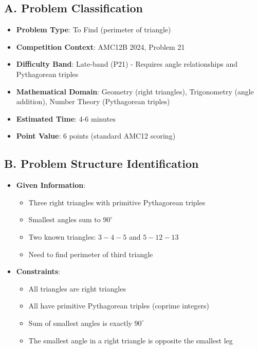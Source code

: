 \documentclass[12pt]{article}
\begin{document}
\begin{problemconfigbox}
\subsection*{A. Problem Classification}
\begin{itemize}[leftmargin=*]
    \item \textbf{Problem Type}: To Find (perimeter of triangle)
    \item \textbf{Competition Context}: AMC12B 2024, Problem 21
    \item \textbf{Difficulty Band}: Late-band (P21) - Requires angle relationships and Pythagorean triples
    \item \textbf{Mathematical Domain}: Geometry (right triangles), Trigonometry (angle addition), Number Theory (Pythagorean triples)
    \item \textbf{Estimated Time}: 4-6 minutes
    \item \textbf{Point Value}: 6 points (standard AMC12 scoring)
\end{itemize}

\subsection*{B. Problem Structure Identification}
\begin{itemize}[leftmargin=*]
    \item \textbf{Given Information}: 
    \begin{itemize}
        \item Three right triangles with primitive Pythagorean triples
        \item Smallest angles sum to $90^{\circ}$
        \item Two known triangles: $3-4-5$ and $5-12-13$
        \item Need to find perimeter of third triangle
    \end{itemize}
    
    \item \textbf{Constraints}: 
    \begin{itemize}
        \item All triangles are right triangles
        \item All have primitive Pythagorean triples (coprime integers)
        \item Sum of smallest angles is exactly $90^{\circ}$
        \item The smallest angle in a right triangle is opposite the smallest leg
    \end{itemize}
    

\end{itemize}
\end{problemconfigbox}
\end{document}
